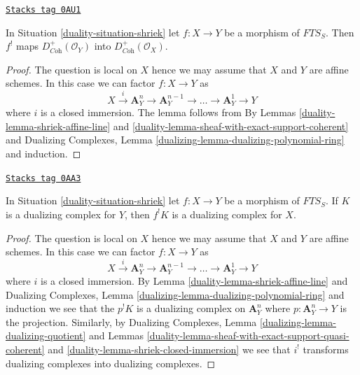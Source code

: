 \begin{lemma}
\label{duality-lemma-shriek-coherent}
\href{https://stacks.math.columbia.edu/tag/0AU1}{\texttt{Stacks tag 0AU1}}

In Situation \ref{duality-situation-shriek} let $f : X \to Y$ be a morphism of
$\textit{FTS}_S$. Then $f^!$ maps
$D_{\textit{Coh}}^+(\mathcal{O}_Y)$ into $D_{\textit{Coh}}^+(\mathcal{O}_X)$.
\end{lemma}

\begin{proof}

The question is local on $X$ hence we may assume that $X$ and $Y$ are
affine schemes. In this case we can factor $f : X \to Y$ as
$$
X \xrightarrow{i} \mathbf{A}^n_Y \to \mathbf{A}^{n - 1}_Y \to \ldots \to
\mathbf{A}^1_Y \to Y
$$
where $i$ is a closed immersion. The lemma follows from
By Lemmas \ref{duality-lemma-shriek-affine-line} and
\ref{duality-lemma-sheaf-with-exact-support-coherent} and
Dualizing Complexes, Lemma
\ref{dualizing-lemma-dualizing-polynomial-ring}
and induction.
\end{proof}

\begin{lemma}
\label{duality-lemma-shriek-dualizing}
\href{https://stacks.math.columbia.edu/tag/0AA3}{\texttt{Stacks tag 0AA3}}

In Situation \ref{duality-situation-shriek} let $f : X \to Y$ be a morphism of
$\textit{FTS}_S$. If $K$ is a dualizing complex
for $Y$, then $f^!K$ is a dualizing complex for $X$.
\end{lemma}

\begin{proof}

The question is local on $X$ hence we may assume that $X$ and $Y$ are
affine schemes. In this case we can factor $f : X \to Y$ as
$$
X \xrightarrow{i} \mathbf{A}^n_Y \to \mathbf{A}^{n - 1}_Y \to \ldots \to
\mathbf{A}^1_Y \to Y
$$
where $i$ is a closed immersion. By Lemma \ref{duality-lemma-shriek-affine-line} and
Dualizing Complexes, Lemma \ref{dualizing-lemma-dualizing-polynomial-ring}
and induction we see that
the $p^!K$ is a dualizing complex on $\mathbf{A}^n_Y$ where
$p : \mathbf{A}^n_Y \to Y$ is the projection. Similarly, by
Dualizing Complexes, Lemma \ref{dualizing-lemma-dualizing-quotient}
and Lemmas
\ref{duality-lemma-sheaf-with-exact-support-quasi-coherent} and
\ref{duality-lemma-shriek-closed-immersion} we see that $i^!$
transforms dualizing complexes into dualizing complexes.
\end{proof}

